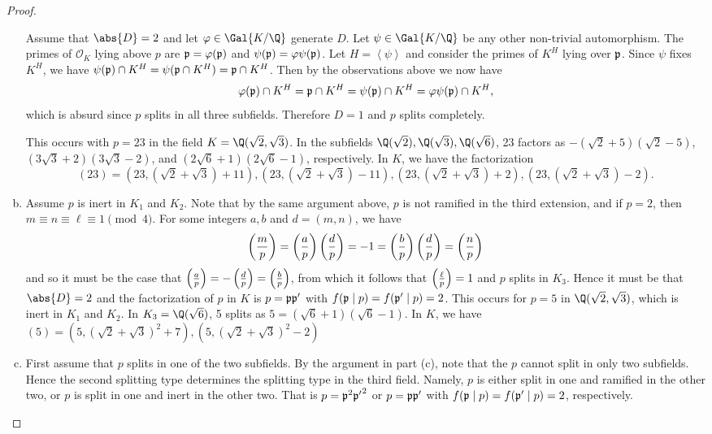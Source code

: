 \documentclass[10pt]{amsart}
\begin{document}
\begin{thm}
\begin{proof}
\begin{enumerate}[(a)]
        Assume that $\abs{D} = 2$ and let $\varphi \in \Gal{K/\Q}$ generate $D$.
        Let $\psi \in \Gal{K/\Q}$ be any other non-trivial automorphism.
        The primes of $\mathcal{O}_K$ lying above $p$ are $\mathfrak{p} = \varphi(\mathfrak{p})$ and $\psi(\mathfrak{p}) = \varphi\psi(\mathfrak{p})$.
        Let $H = \left<\psi\right>$ and consider the primes of $K^H$ lying over $\mathfrak{p}$.
        Since $\psi$ fixes $K^H$, we have $\psi(\mathfrak{p}) \cap K^H = \psi(\mathfrak{p} \cap K^H) = \mathfrak{p} \cap K^H$.
        Then by the observations above we now have
        $$\varphi(\mathfrak{p}) \cap K^H = \mathfrak{p} \cap K^H  = \psi(\mathfrak{p}) \cap K^H = \varphi\psi(\mathfrak{p}) \cap K^H,$$
        which is absurd since $p$ splits in all three subfields.
        Therefore $D = 1$ and $p$ splits completely.
        
        This occurs with $p = 23$ in the field $K = \Q(\sqrt{2}, \sqrt{3})$.
        In the subfields $\Q(\sqrt{2}), \Q(\sqrt{3}), \Q(\sqrt{6})$, 23 factors as $-(\sqrt{2} + 5)(\sqrt{2} - 5)$, $(3\sqrt{3} + 2)(3\sqrt{3} - 2)$, and $(2\sqrt{6} + 1)(2\sqrt{6} - 1)$, respectively.
        In $K$, we have the factorization 
        $$(23) = (23, (\sqrt{2} + \sqrt{3}) + 11), (23, (\sqrt{2} + \sqrt{3}) - 11), (23, (\sqrt{2} + \sqrt{3}) + 2), (23, (\sqrt{2} + \sqrt{3}) - 2).$$
      \item
        Assume $p$ is inert in $K_1$ and $K_2$.
        Note that by the same argument above, $p$ is not ramified in the third extension, and if $p = 2$, then $m \equiv n \equiv \ell \equiv 1 \pmod{4}$.
        For some integers $a,b$ and $d = (m,n)$, we have 
        $$\left(\frac{m}{p}\right) = \left(\frac{a}{p}\right)\left(\frac{d}{p}\right) = -1 = \left(\frac{b}{p}\right)\left(\frac{d}{p}\right)= \left(\frac{n}{p}\right)$$
        and so it must be the case that $\left(\frac{a}{p}\right) = -\left(\frac{d}{p}\right) = \left(\frac{b}{p}\right)$, from which it follows that $\left(\frac{\ell}{p}\right) = 1$ and $p$ splits in $K_3$.
        Hence it must be that $\abs{D} = 2$ and the factorization of $p$ in $K$ is $p = \mathfrak{p}\mathfrak{p}^\prime$ with $f(\mathfrak{p} \mid p) = f(\mathfrak{p}^\prime \mid p) = 2$.
        This occurs for $p = 5$ in $\Q(\sqrt{2}, \sqrt{3})$, which is inert in $K_1$ and $K_2$.
        In $K_3 = \Q(\sqrt{6})$, 5 splits as $5 = (\sqrt{6} + 1)(\sqrt{6} - 1)$.
        In $K$, we have $(5) = (5, (\sqrt{2} + \sqrt{3})^2 + 7), (5, (\sqrt{2} + \sqrt{3})^2 - 2)$
      \item
        First assume that $p$ splits in one of the two subfields.
        By the argument in part (c), note that the $p$ cannot split in only two subfields.
        Hence the second splitting type determines the splitting type in the third field.
        Namely, $p$ is either split in one and ramified in the other two, or $p$ is split in one and inert in the other two.
        That is $p = \mathfrak{p}^2{\mathfrak{p}^\prime}^2$ or $p = \mathfrak{p}\mathfrak{p}^\prime$ with $f(\mathfrak{p} \mid p) = f(\mathfrak{p}^\prime \mid p) = 2$, respectively.
        

\end{enumerate}
\end{proof}
\end{thm}
\end{document}
